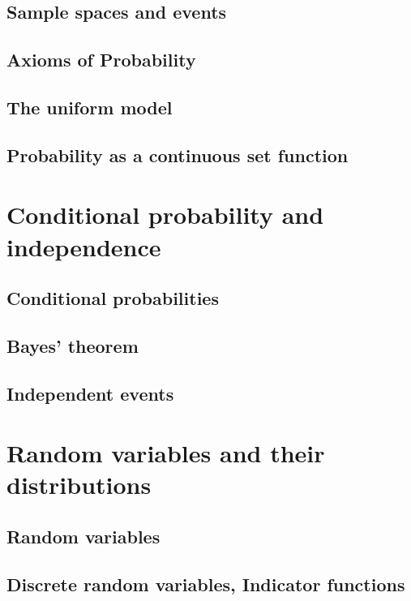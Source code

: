 \documentclass[11pt]{article}
\theoremstyle{definition}
\theoremstyle{plain}
\theoremstyle{remark}
\begin{document}
\subsection{Sample spaces and events}

\subsection{Axioms of Probability}

\subsection{The uniform model}

\subsection{Probability as a continuous set function}

\section{Conditional probability and independence}

\subsection{Conditional probabilities}

\subsection{Bayes’ theorem}

\subsection{Independent events}

\section{Random variables and their distributions}

\subsection{Random variables}

\subsection{Discrete random variables, Indicator functions}
\end{document}
